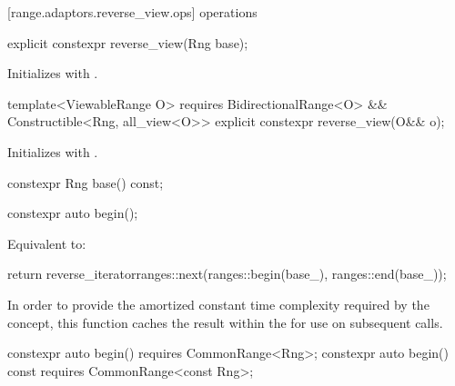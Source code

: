 [range.adaptors.reverse_view.ops]{ operations}

%
\begin{itemdecl}
explicit constexpr reverse_view(Rng base);
\end{itemdecl}

\begin{itemdescr}
\pnum
\effects Initializes  with .
\end{itemdescr}

%
\begin{itemdecl}
template<ViewableRange O>
  requires BidirectionalRange<O> && Constructible<Rng, all_view<O>>
explicit constexpr reverse_view(O&& o);
\end{itemdecl}

\begin{itemdescr}
\pnum
\effects Initializes  with .
\end{itemdescr}

%
\begin{itemdecl}
constexpr Rng base() const;
\end{itemdecl}

\begin{itemdescr}
\pnum
\oldtxt{\returns}  
\end{itemdescr}

%
\begin{itemdecl}
constexpr auto begin();
\end{itemdecl}

\begin{itemdescr}
\pnum
\effects Equivalent to:
\begin{codeblock}
return reverse_iterator{ranges::next(ranges::begin(base_), ranges::end(base_))};
\end{codeblock}

\pnum
\remarks In order to provide the amortized constant time complexity required by
the  concept, this function caches the result within the
 for use on subsequent calls.
\end{itemdescr}

%
\begin{itemdecl}
constexpr auto begin() requires CommonRange<Rng>;
constexpr auto begin() const requires CommonRange<const Rng>;
\end{itemdecl}

